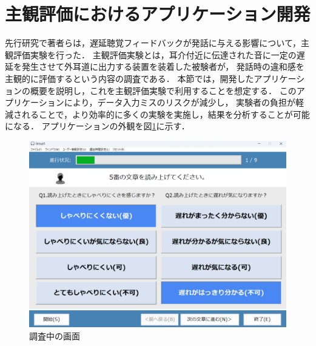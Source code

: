 \section{主観評価におけるアプリケーション開発}
先行研究\cite{cf:kayama}で著者らは，遅延聴覚フィードバックが発話に与える影響について，主観評価実験を行った．
主観評価実験とは，耳介付近に伝達された音に一定の遅延を発生させて外耳道に出力する装置を装着した被験者が，
発話時の違和感を主観的に評価するという内容の調査である．
本節では，開発したアプリケーションの概要を説明し，これを主観評価実験で利用することを想定する．
このアプリケーションにより，データ入力ミスのリスクが減少し，
実験者の負担が軽減されることで，より効率的に多くの実験を実施し，結果を分析することが可能になる．
アプリケーションの外観を図\ref{fig:2_userInterface}に示す．
\begin{figure}[tbp]
  \centering
  \includegraphics[scale=0.22]{figures/Syukann/app_2.pdf}
  \caption{調査中の画面}
  \label{fig:2_userInterface}
\end{figure}